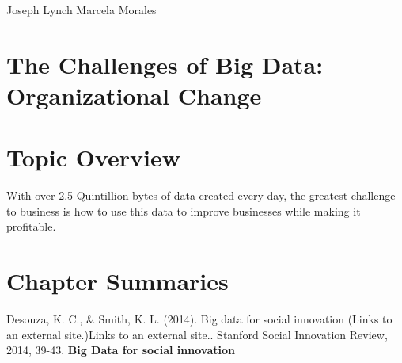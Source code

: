 \documentclass[]{book}
\begin{document}
Joseph Lynch
Marcela Morales

\hypertarget{the-challenges-of-big-data-organizational-change}{%
\section{The Challenges of Big Data: Organizational Change}\label{the-challenges-of-big-data-organizational-change}}

\hypertarget{topic-overview-2}{%
\section{Topic Overview}\label{topic-overview-2}}

With over 2.5 Quintillion bytes of data created every day, the greatest challenge to business is how to use this data to improve businesses while making it profitable.

\hypertarget{chapter-summaries-2}{%
\section{Chapter Summaries}\label{chapter-summaries-2}}

Desouza, K. C., \& Smith, K. L. (2014). Big data for social innovation (Links to an external site.)Links to an external site.. Stanford Social Innovation Review, 2014, 39-43.
\textbf{Big Data for social innovation}
\end{document}
